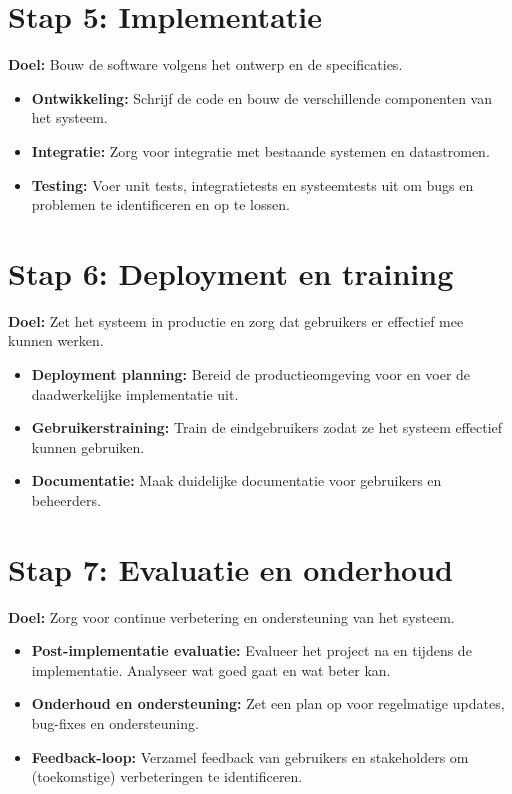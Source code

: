 \documentclass[8pt]{extarticle}
\begin{document}
%
%

\section*{Stap 5: Implementatie}
\textbf{Doel:} Bouw de software volgens het ontwerp en de specificaties.

\begin{itemize}
    \item \textbf{Ontwikkeling:} Schrijf de code en bouw de verschillende componenten van het systeem.
    \item \textbf{Integratie:} Zorg voor integratie met bestaande systemen en datastromen.
    \item \textbf{Testing:} Voer unit tests, integratietests en systeemtests uit om bugs en problemen te identificeren en op te lossen.
\end{itemize}

%
%

\section*{Stap 6: Deployment en training}
\textbf{Doel:} Zet het systeem in productie en zorg dat gebruikers er effectief mee kunnen werken.

\begin{itemize}
    \item \textbf{Deployment planning:} Bereid de productieomgeving voor en voer de daadwerkelijke implementatie uit.
    \item \textbf{Gebruikerstraining:} Train de eindgebruikers zodat ze het systeem effectief kunnen gebruiken.
    \item \textbf{Documentatie:} Maak duidelijke documentatie voor gebruikers en beheerders.
\end{itemize}

%
%

\section*{Stap 7: Evaluatie en onderhoud}
\textbf{Doel:} Zorg voor continue verbetering en ondersteuning van het systeem.

\begin{itemize}
    \item \textbf{Post-implementatie evaluatie:} Evalueer het project na en tijdens de implementatie. Analyseer wat goed gaat en wat beter kan.
    \item \textbf{Onderhoud en ondersteuning:} Zet een plan op voor regelmatige updates, bug-fixes en ondersteuning.
    \item \textbf{Feedback-loop:} Verzamel feedback van gebruikers en stakeholders om (toekomstige) verbeteringen te identificeren.
\end{itemize}
\end{document}
